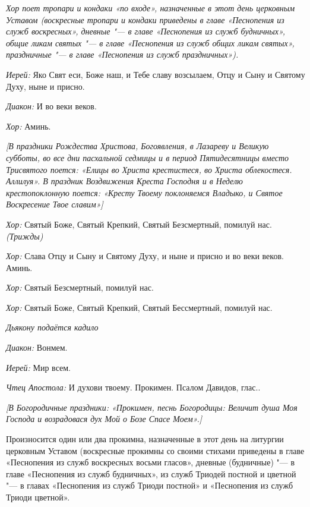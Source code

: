 \begin{mymulticols}


{\itshape Хор поет тропари и кондаки «по входе», назначенные в этот день церковным Уставом (воскресные тропари и кондаки приведены в главе «Песнопения из служб воскресных», дневные "--- в главе «Песнопения из служб будничных», общие ликам святых "--- в главе «Песнопения из служб общих ликам святых», праздничные "--- в главе «Песнопения из служб праздничных»).}


{\itshape Иерей:} Яко Свят еси, Боже наш, и Тебе славу возсылаем, Отцу и Сыну и Святому Духу, ныне и присно.


{\itshape Диакон:} И во веки веков.


{\itshape Хор:} Аминь.






{\itshape [В праздники Рождества Христова, Богоявления, в Лазареву и Великую субботы, во все дни пасхальной седмицы и в период Пятидесятницы вместо Трисвятого поется: «Елицы во Христа крестистеся, во Христа облекостеся. Аллилуя». В праздник Воздвижения Креста Господня и в Неделю крестопоклонную поется: «Кресту Твоему поклоняемся Владыко, и Святое Воскресение Твое славим»]}


{\itshape Хор:} Святый Боже, Святый Крепкий, Святый Безсмертный, помилуй нас. {\itshape (Трижды)}


{\itshape Хор:} Слава Отцу и Сыну и Святому Духу, и ныне и присно и во веки веков. Аминь.

{\itshape Хор:} Святый Безсмертный, помилуй нас.

{\itshape Хор:} Святый Боже, Святый Крепкий, Святый Бессмертный, помилуй нас.




{\itshape Дьякону подаётся кадило}


{\itshape Диакон:} Вонмем.


{\itshape Иерей:} Мир всем.


{\itshape Чтец Апостола:} И духови твоему. Прокимен. Псалом Давидов, глас..




{\itshape [В Богородичные праздники: «Прокимен, песнь Богородицы: Величит душа Моя Господа и возрадовася дух Мой о Бозе Спасе Моем».]


Произносится один или два прокимна, назначенные в этот день на литургии церковным Уставом (воскресные прокимны со своими стихами приведены в главе «Песнопения из служб воскресных восьми гласов», дневные (будничные) "--- в главе «Песнопения из служб будничных», из служб Триодей постной и цветной "--- в главах «Песнопения из служб Триоди постной» и «Песнопения из служб Триоди цветной».


}
\end{mymulticols}
